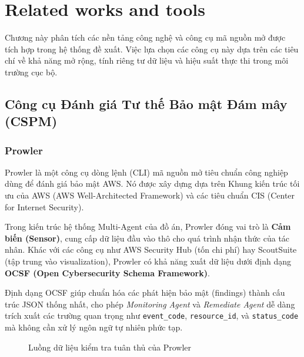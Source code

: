 \chapter{Related works and tools}

Chương này phân tích các nền tảng công nghệ và công cụ mã nguồn mở được tích hợp trong hệ thống đề xuất. Việc lựa chọn các công cụ này dựa trên các tiêu chí về khả năng mở rộng, tính riêng tư dữ liệu và hiệu suất thực thi trong môi trường cục bộ.

\section{Công cụ Đánh giá Tư thế Bảo mật Đám mây (CSPM)}

\subsection{Prowler}
Prowler là một công cụ dòng lệnh (CLI) mã nguồn mở tiêu chuẩn công nghiệp dùng để đánh giá bảo mật AWS. Nó được xây dựng dựa trên Khung kiến trúc tối ưu của AWS (AWS Well-Architected Framework) và các tiêu chuẩn CIS (Center for Internet Security).

Trong kiến trúc hệ thống Multi-Agent của đồ án, Prowler đóng vai trò là \textbf{Cảm biến (Sensor)}, cung cấp dữ liệu đầu vào thô cho quá trình nhận thức của tác nhân. Khác với các công cụ như AWS Security Hub (tốn chi phí) hay ScoutSuite (tập trung vào visualization), Prowler có khả năng xuất dữ liệu dưới định dạng \textbf{OCSF (Open Cybersecurity Schema Framework)}.

Định dạng OCSF giúp chuẩn hóa các phát hiện bảo mật (findings) thành cấu trúc JSON thống nhất, cho phép \textit{Monitoring Agent} và \textit{Remediate Agent} dễ dàng trích xuất các trường quan trọng như \texttt{event\_code}, \texttt{resource\_id}, và \texttt{status\_code} mà không cần xử lý ngôn ngữ tự nhiên phức tạp.

\begin{figure}[H]
  \centering
  \caption{Luồng dữ liệu kiểm tra tuân thủ của Prowler}
  \label{fig:prowler_arch}
\end{figure}

